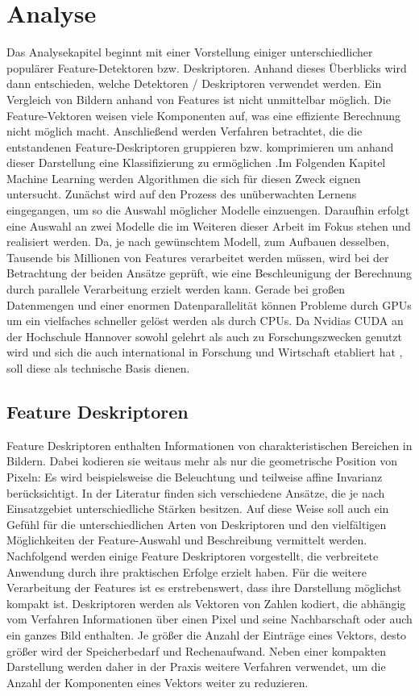 \chapter{Analyse}

Das Analysekapitel beginnt mit einer Vorstellung einiger unterschiedlicher populärer Feature-Detektoren bzw. Deskriptoren. Anhand dieses Überblicks wird dann entschieden, welche Detektoren / Deskriptoren verwendet werden. Ein Vergleich von Bildern anhand von Features ist nicht unmittelbar möglich. Die Feature-Vektoren weisen viele Komponenten auf, was eine effiziente Berechnung nicht möglich macht.
Anschließend werden Verfahren betrachtet, die die entstandenen Feature-Deskriptoren gruppieren bzw. komprimieren um anhand dieser Darstellung eine Klassifizierung zu ermöglichen .Im Folgenden Kapitel Machine Learning werden Algorithmen die sich für diesen Zweck eignen untersucht. Zunächst wird auf den Prozess des unüberwachten Lernens eingegangen, um so die Auswahl möglicher Modelle einzuengen. Daraufhin erfolgt eine Auswahl an zwei Modelle die im Weiteren dieser Arbeit im Fokus stehen und realisiert werden. 
Da, je nach gewünschtem Modell, zum Aufbauen desselben, Tausende bis Millionen von Features verarbeitet werden müssen, wird bei der Betrachtung der beiden Ansätze geprüft, wie eine Beschleunigung der Berechnung durch parallele Verarbeitung erzielt werden kann. Gerade bei großen Datenmengen und einer enormen Datenparallelität können Probleme durch GPUs um ein vielfaches schneller gelöst werden als durch CPUs. Da Nvidias CUDA an der Hochschule Hannover sowohl gelehrt als auch zu Forschungszwecken genutzt wird und sich die  auch international in Forschung und Wirtschaft etabliert hat \todo{[REF]}, soll diese als technische Basis dienen. 

\section{Feature Deskriptoren}
\label{extraction}

Feature Deskriptoren enthalten Informationen von charakteristischen Bereichen in Bildern. Dabei kodieren sie weitaus mehr als nur die geometrische Position von Pixeln: Es wird beispielsweise die Beleuchtung und teilweise affine Invarianz berücksichtigt. In der Literatur finden sich verschiedene Ansätze, die je nach Einsatzgebiet unterschiedliche Stärken besitzen. Auf diese Weise soll auch ein Gefühl für die unterschiedlichen Arten von Deskriptoren und den vielfältigen Möglichkeiten der Feature-Auswahl und Beschreibung vermittelt werden. Nachfolgend werden einige Feature Deskriptoren vorgestellt, die verbreitete Anwendung durch ihre praktischen Erfolge erzielt haben. Für die weitere Verarbeitung der Features ist es erstrebenswert, dass ihre Darstellung möglichst kompakt ist. Deskriptoren werden als Vektoren von Zahlen kodiert, die abhängig vom Verfahren Informationen über einen Pixel und seine Nachbarschaft oder auch ein ganzes Bild enthalten. Je größer die Anzahl der Einträge eines Vektors, desto größer wird der Speicherbedarf und Rechenaufwand. Neben einer kompakten Darstellung werden daher in der Praxis weitere Verfahren verwendet, um die Anzahl der Komponenten eines Vektors weiter zu reduzieren. 

